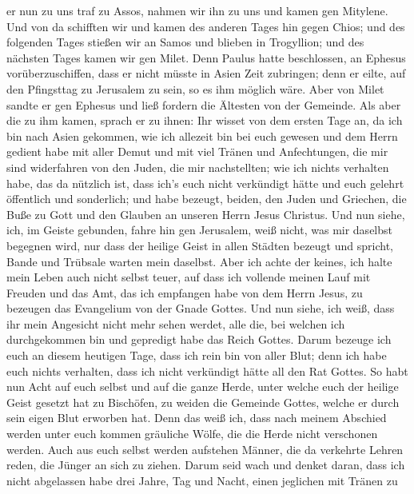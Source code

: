 er nun zu uns traf zu Assos, nahmen wir ihn zu uns und kamen gen
Mitylene.  Und von da schifften wir und kamen des anderen
Tages hin gegen Chios; und des folgenden Tages stießen wir an Samos und
blieben in Trogyllion; und des nächsten Tages kamen wir gen Milet.
 Denn Paulus hatte beschlossen, an Ephesus
vorüberzuschiffen, dass er nicht müsste in Asien Zeit zubringen; denn er
eilte, auf den Pfingsttag zu Jerusalem zu sein, so es ihm möglich wäre.
 Aber von Milet sandte er gen Ephesus und ließ fordern die
Ältesten von der Gemeinde.  Als aber die zu ihm kamen,
sprach er zu ihnen: Ihr wisset von dem ersten Tage an, da ich bin nach
Asien gekommen, wie ich allezeit bin bei euch gewesen  und
dem Herrn gedient habe mit aller Demut und mit viel Tränen und
Anfechtungen, die mir sind widerfahren von den Juden, die mir
nachstellten;  wie ich nichts verhalten habe, das da
nützlich ist, dass ich's euch nicht verkündigt hätte und euch gelehrt
öffentlich und sonderlich;  und habe bezeugt, beiden, den
Juden und Griechen, die Buße zu Gott und den Glauben an unseren Herrn
Jesus Christus.  Und nun siehe, ich, im Geiste gebunden,
fahre hin gen Jerusalem, weiß nicht, was mir daselbst begegnen wird,
 nur dass der heilige Geist in allen Städten bezeugt und
spricht, Bande und Trübsale warten mein daselbst.  Aber ich
achte der keines, ich halte mein Leben auch nicht selbst teuer, auf dass
ich vollende meinen Lauf mit Freuden und das Amt, das ich empfangen habe
von dem Herrn Jesus, zu bezeugen das Evangelium von der Gnade Gottes.
 Und nun siehe, ich weiß, dass ihr mein Angesicht nicht
mehr sehen werdet, alle die, bei welchen ich durchgekommen bin und
gepredigt habe das Reich Gottes.  Darum bezeuge ich euch an
diesem heutigen Tage, dass ich rein bin von aller Blut; 
denn ich habe euch nichts verhalten, dass ich nicht verkündigt hätte all
den Rat Gottes.  So habt nun Acht auf euch selbst und auf
die ganze Herde, unter welche euch der heilige Geist gesetzt hat zu
Bischöfen, zu weiden die Gemeinde Gottes, welche er durch sein eigen
Blut erworben hat.  Denn das weiß ich, dass nach meinem
Abschied werden unter euch kommen gräuliche Wölfe, die die Herde nicht
verschonen werden.  Auch aus euch selbst werden aufstehen
Männer, die da verkehrte Lehren reden, die Jünger an sich zu ziehen.
 Darum seid wach und denket daran, dass ich nicht
abgelassen habe drei Jahre, Tag und Nacht, einen jeglichen mit Tränen zu
